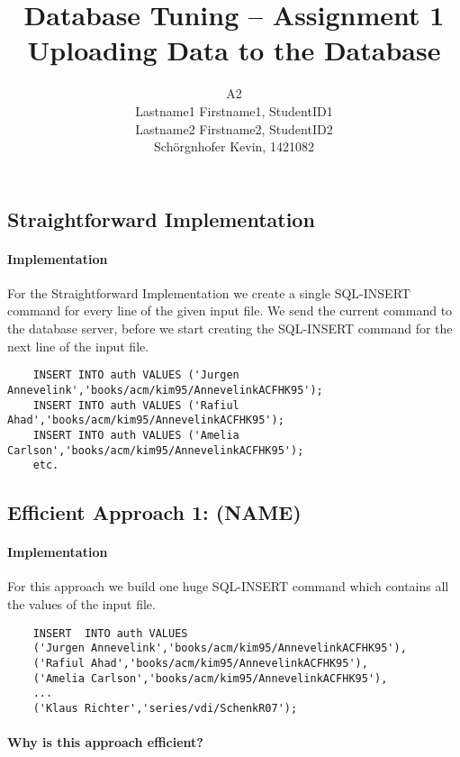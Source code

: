 \documentclass[11pt]{scrartcl}
\title{
  \textbf{\large Database Tuning -- Assignment 1}\\
  Uploading Data to the Database
}
\author{
 A2\\
 \large Lastname1 Firstname1, StudentID1 \\
 \large Lastname2 Firstname2, StudentID2 \\
 \large Sch\"orgnhofer Kevin, 1421082
}
\begin{document}
\maketitle

\subsection*{Straightforward Implementation}

  \paragraph{Implementation}

  For the Straightforward Implementation we create a single SQL-INSERT command for every line of the given input file. We send the current command to the database server, before we start creating the SQL-INSERT command for the next line of the input file.

{\small
\begin{verbatim}
    INSERT INTO auth VALUES ('Jurgen Annevelink','books/acm/kim95/AnnevelinkACFHK95');
    INSERT INTO auth VALUES ('Rafiul Ahad','books/acm/kim95/AnnevelinkACFHK95');
    INSERT INTO auth VALUES ('Amelia Carlson','books/acm/kim95/AnnevelinkACFHK95');
    etc.
\end{verbatim}
}

  \subsection*{Efficient Approach 1: (NAME)}

  \paragraph{Implementation}

  For this approach we build one huge SQL-INSERT command which contains all the values of the input file.

{\small
\begin{verbatim}
    INSERT  INTO auth VALUES
    ('Jurgen Annevelink','books/acm/kim95/AnnevelinkACFHK95'),
    ('Rafiul Ahad','books/acm/kim95/AnnevelinkACFHK95'),
    ('Amelia Carlson','books/acm/kim95/AnnevelinkACFHK95'),
    ...
    ('Klaus Richter','series/vdi/SchenkR07');
\end{verbatim}
}

  \paragraph{Why is this approach efficient?}
\end{document}
